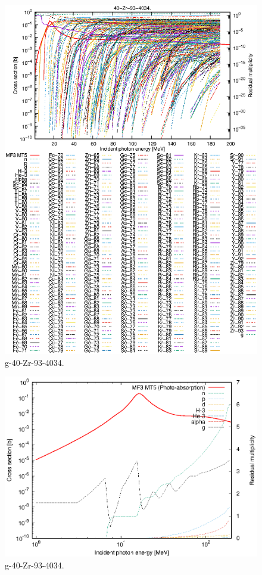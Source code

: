 \begin{figure}
 \includegraphics[width=\linewidth]{eps/g_40-Zr-93_4034.eps}
  \caption{g-40-Zr-93-4034.}
\end{figure}
\newpage \clearpage

\begin{figure}
 \includegraphics[width=\linewidth]{eps-log/g_40-Zr-93_4034.eps}
 \caption{g-40-Zr-93-4034.}
\end{figure}
\newpage \clearpage

